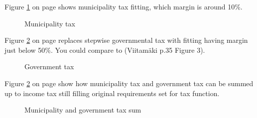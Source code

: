 Figure \ref{fig:muntax} on page \pageref{fig:muntax}
shows municipality tax fitting, which margin is around 10\%. 
\begin{figure} %
 \begin{center}
  \caption{Municipality tax}
  \label{fig:muntax} 
 \end{center}
\end{figure}
Figure \ref{fig:govtax} on page \pageref{fig:govtax}
replaces stepwise governmental tax with fitting having margin just below 50\%.
You could compare to (Viitam\"aki\allowbreak\cite{VM_46_2019} p.35 Figure 3).
\begin{figure} %
 \begin{center}
  \caption{Government tax}
  \label{fig:govtax} 
 \end{center}
\end{figure}
Figure \ref{fig:govtax} on page \pageref{fig:govtax}
show how municipality tax and government tax can be summed up to income tax
still filling original requirements set for tax function.
\begin{figure} %
 \begin{center}
  \caption{Municipality and government tax sum}
  \label{fig:sumtax} 
 \end{center}
\end{figure}


